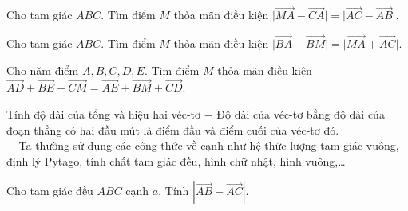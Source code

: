 %
\begin{bt}%
	Cho  tam giác $ABC$. Tìm điểm $M$ thỏa mãn điều kiện $\vert\vec{MA}-\vec{CA}\vert =\vert\vec{AC}-\vec{AB}\vert$.
\end{bt}
%
\begin{bt}%
	Cho  tam giác $ABC$. Tìm điểm $M$ thỏa mãn điều kiện $\vert\vec{BA}-\vec{BM}\vert =\vert\vec{MA}+\vec{AC}\vert$.
\end{bt}
%
\begin{bt}%
	Cho năm điểm $A,B,C,D,E$. Tìm điểm $M$ thỏa mãn điều kiện $\vec{AD}+\vec{BE}+\vec{CM}=\vec{AE}+\vec{BM}+\vec{CD}$.
\end{bt}


\begin{dang}{Tính độ dài của tổng và hiệu hai véc-tơ}
	$-$ Độ dài của véc-tơ bằng độ dài của đoạn thẳng có hai đầu mút là điểm đầu và điểm cuối của véc-tơ đó.
	\\$-$ Ta thường sử dụng các công thức về cạnh như hệ thức lượng tam giác vuông, định lý Pytago, tính chất tam giác đều, hình chữ nhật, hình vuông,\ldots
\end{dang}

\begin{vd}%
	Cho tam giác đều $ABC$ cạnh $a$. Tính $\left| \overrightarrow{AB}  -  \overrightarrow{AC}\right|$.
\end{vd}



